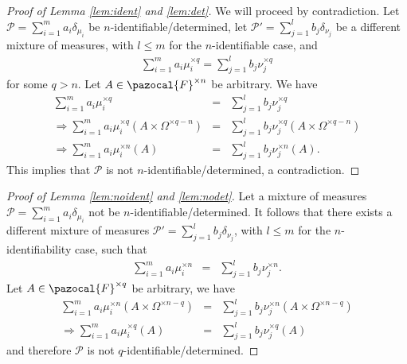 \documentclass[aos]{imsart}
\def\sF{\pazocal{F}}
\def\sP{\mathscr{P}}
\theoremstyle{plain}
\theoremstyle{defintion}
\begin{document}
	\begin{proof}[Proof of Lemma \ref{lem:ident} and \ref{lem:det}]
		We will proceed by contradiction. Let $\sP = \sum_{i=1}^m a_i \delta_{\mu_i}$ be $n$-identifiable/determined, let $\sP' = \sum_{j=1}^l b_j \delta_{\nu_j}$ be a different mixture of measures, with $l\le m$ for the $n$-identifiable case, and 
		\begin{eqnarray*}
			\sum_{i=1}^m a_i \mu_i^{\times q} = \sum_{j=1}^l b_j \nu_j^{\times q}
		\end{eqnarray*}
		for some $q>n$. Let $A \in \sF^{\times n}$ be arbitrary. We have
		\begin{eqnarray*}
			\sum_{i=1}^m a_i \mu_i^{\times q} &=& \sum_{j=1}^l b_j \nu_j^{\times q}\\
			\Rightarrow \sum_{i=1}^m a_i \mu_i^{\times q}\left( A\times \Omega^{\times q-n} \right) &=& \sum_{j=1}^l b_j \nu_j^{\times q}\left( A\times \Omega^{\times q-n} \right)\\
			\Rightarrow \sum_{i=1}^m a_i \mu_i^{\times n}\left( A \right) &=& \sum_{j=1}^l b_j \nu_j^{\times n}\left( A  \right).
		\end{eqnarray*}
		This implies that $\sP$ is not $n$-identifiable/determined, a contradiction.
	\end{proof}
	\begin{proof}[Proof of Lemma \ref{lem:noident} and \ref{lem:nodet}]
		Let a mixture of measures $\sP = \sum_{i=1}^m a_i \delta_{\mu_i}$ not be $n$-identifiable/determined. It follows that there exists a different mixture of measures $\sP' = \sum_{j=1}^l b_j \delta_{\nu_j}$, with $l\le m$ for the $n$-identifiability case, such that
		\begin{eqnarray*}
			\sum_{i=1}^m a_i \mu_i^{\times n} &=& \sum_{j=1}^l b_j \nu_j^{\times n}.
		\end{eqnarray*}
		Let $A \in \sF^{\times q}$ be arbitrary, we have
		\begin{eqnarray*}
			\sum_{i=1}^m a_i \mu_i^{\times n}\left( A\times \Omega^{\times n-q} \right) &=& \sum_{j=1}^l b_j \nu_j^{\times n}\left( A\times \Omega^{\times n-q} \right)\\
			\Rightarrow \sum_{i=1}^m a_i \mu_i^{\times q}\left( A  \right) &=& \sum_{j=1}^l b_j \nu_j^{\times q}\left( A \right)
		\end{eqnarray*}
		and therefore $\sP$ is not $q$-identifiable/determined.
	\end{proof}
\end{document}
